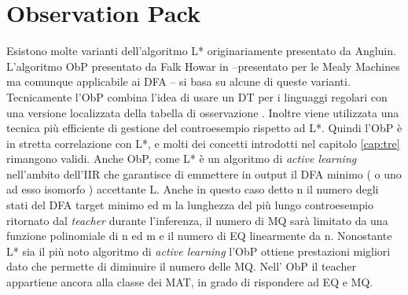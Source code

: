 
\chapter{Observation Pack} %
\label{cap:quattro}
Esistono molte varianti dell'algoritmo L* originariamente presentato da Angluin. L'algoritmo \ac{ObP} presentato da Falk Howar in \cite{Howar12} --presentato per le Mealy Machines ma comunque applicabile ai DFA -- si basa su alcune di queste varianti. Tecnicamente l'\ac{ObP} combina l'idea di usare un \ac{DT} per i linguaggi regolari \cite{Kearns94} con una versione localizzata della tabella di osservazione \cite{Schapire93}. Inoltre viene utilizzata una tecnica più efficiente di gestione del controesempio rispetto ad L*. Quindi l'\ac{ObP}  è in stretta correlazione con L*, e molti dei concetti introdotti nel capitolo \ref{cap:tre} rimangono validi. Anche \ac{ObP}, come L* è un algoritmo di \textit{active learning} nell'ambito dell'\ac{IIR} che garantisce di emmettere in output il \ac{DFA} minimo ( o uno ad esso isomorfo ) accettante \ac{L}. Anche in questo caso detto n il numero degli stati del DFA target minimo ed m la lunghezza del più lungo controesempio ritornato dal \textit{teacher} durante l'inferenza, il numero di \ac{MQ} sarà limitato da una funzione polinomiale di n ed m e il numero di \ac{EQ} linearmente da n. Nonostante L* sia il più noto algoritmo di \textit{active learning} l'\ac{ObP} ottiene prestazioni migliori dato che permette di diminuire il numero delle \ac{MQ}. Nell' \ac{ObP} il teacher appartiene ancora alla classe dei \ac{MAT}, in grado di rispondere ad \ac{EQ} e \ac{MQ}.

